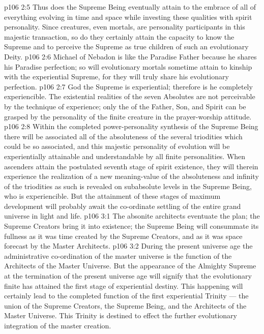 \vs p106 2:5 Thus does the Supreme Being eventually attain to the embrace of all of everything evolving in time and space while investing these qualities with spirit personality. Since creatures, even mortals, are personality participants in this majestic transaction, so do they certainly attain the capacity to know the Supreme and to perceive the Supreme as true children of such an evolutionary Deity.
\vs p106 2:6 \pc Michael of Nebadon is like the Paradise Father because he shares his Paradise perfection; so will evolutionary mortals sometime attain to kinship with the experiential Supreme, for they will truly share his evolutionary perfection.
\vs p106 2:7 \pc God the Supreme is experiential; therefore is he completely experiencible. The existential realities of the seven Absolutes are not perceivable by the technique of experience; only the  of the Father, Son, and Spirit can be grasped by the personality of the finite creature in the prayer\hyp{}worship attitude.
\vs p106 2:8 Within the completed power\hyp{}personality synthesis of the Supreme Being there will be associated all of the absoluteness of the several triodities which could be so associated, and this majestic personality of evolution will be experientially attainable and understandable by all finite personalities. When ascenders attain the postulated seventh stage of spirit existence, they will therein experience the realization of a new meaning\hyp{}value of the absoluteness and infinity of the triodities as such is revealed on subabsolute levels in the Supreme Being, who is experiencible. But the attainment of these stages of maximum development will probably await the co\hyp{}ordinate settling of the entire grand universe in light and life.
\vs p106 3:1 The absonite architects eventuate the plan; the Supreme Creators bring it into existence; the Supreme Being will consummate its fullness as it was time created by the Supreme Creators, and as it was space forecast by the Master Architects.
\vs p106 3:2 During the present universe age the administrative co\hyp{}ordination of the master universe is the function of the Architects of the Master Universe. But the appearance of the Almighty Supreme at the termination of the present universe age will signify that the evolutionary finite has attained the first stage of experiential destiny. This happening will certainly lead to the completed function of the first experiential Trinity --- the union of the Supreme Creators, the Supreme Being, and the Architects of the Master Universe. This Trinity is destined to effect the further evolutionary integration of the master creation.
